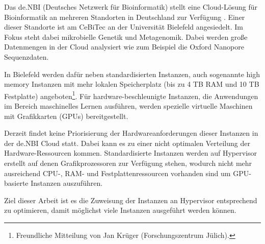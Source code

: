 \documentclass[../Main.tex]{subfiles}
\begin{document}
Das de.NBI (Deutsches Netzwerk für Bioinformatik) stellt eine Cloud-Lösung für Bioinformatik an mehreren Standorten in Deutschland zur Verfügung \citep{deNBI}.
Einer dieser Standorte ist am CeBiTec an der Universität Bielefeld angesiedelt.
Im Fokus steht dabei mikrobielle Genetik und Metagenomik. Dabei werden gro{\ss}e Datenmengen
in der Cloud analysiert wie zum Beispiel die Oxford Nanopore Sequenzdaten.

In Bielefeld werden dafür neben standardisierten Instanzen, auch sogenannte \glqq high memory\grqq{} Instanzen mit mehr
lokalen Speicherplatz (bis zu 4 TB RAM und 10 TB Festplatte) angeboten\footnote{Freundliche Mitteilung von Jan Krüger (Forschungszentrum Jülich).}. Für hardware-beschleunigte
Instanzen, die Anwendungen im Bereich maschinelles Lernen ausführen, werden spezielle virtuelle Maschinen
mit Grafikkarten (GPUs) bereitgestellt.

Derzeit findet keine Priorisierung der Hardwareanforderungen dieser Instanzen in der de.NBI Cloud statt. Dabei kann es zu einer nicht optimalen
Verteilung der Hardware-Ressourcen kommen. Standardisierte Instanzen werden
auf Hypervisor erstellt auf denen Grafikprozessoren zur Verfügung stehen, wodurch nicht mehr ausreichend CPU-, RAM- und Festplattenressourcen
vorhanden sind um GPU-basierte Instanzen auszuführen.

Ziel dieser Arbeit ist es die Zuweisung der Instanzen an Hypervisor entsprechend zu optimieren, damit möglichst viele Instanzen
ausgeführt werden können.

\biblio %
\end{document}
